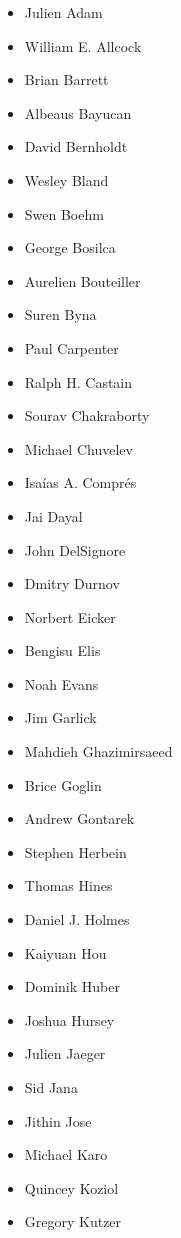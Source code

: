 \begin{itemize}
    \item Julien Adam %
    \item William E. Allcock
    \item Brian Barrett
    \item Albeaus Bayucan
    \item David Bernholdt
    \item Wesley Bland
    \item Swen Boehm
    \item George Bosilca
    \item Aurelien Bouteiller
    \item Suren Byna
    \item Paul Carpenter
    \item Ralph H. Castain
    \item Sourav Chakraborty
    \item Michael Chuvelev
    \item Isaías A. Comprés
    \item Jai Dayal
    \item John DelSignore
    \item Dmitry Durnov
    \item Norbert Eicker
    \item Bengisu Elis
    \item Noah Evans
    \item Jim Garlick
    \item Mahdieh Ghazimirsaeed
    \item Brice Goglin
    \item Andrew Gontarek
    \item Stephen Herbein
    \item Thomas Hines
    \item Daniel J. Holmes
    \item Kaiyuan Hou
    \item Dominik Huber
    \item Joshua Hursey
    \item Julien Jaeger
    \item Sid Jana
    \item Jithin Jose
    \item Michael Karo
    \item Quincey Koziol
    \item Gregory Kutzer

\end{itemize}
